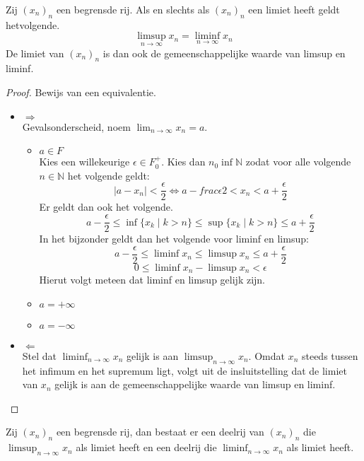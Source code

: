 \documentclass[main.tex]{subfiles}
\begin{document}
\begin{pr}
  Zij $(x_{n})_{n}$ een begrensde rij.
  Als en slechts als $(x_{n})_{n}$ een limiet heeft geldt hetvolgende.
  \[ \limsup_{n\rightarrow \infty} x_{n} = \liminf_{n\rightarrow \infty} x_{n} \]
  De limiet van $(x_{n})_{n}$ is dan ook de gemeenschappelijke waarde van limsup en liminf.

  \begin{proof}
    Bewijs van een equivalentie.
    \begin{itemize}
    \item $\Rightarrow$\\
      Gevalsonderscheid, noem $\lim_{n\rightarrow \infty}x_{n} = a$.
      \begin{itemize}
      \item $a\in F$\\
        Kies een willekeurige $\epsilon \in F_{0}^{+}$.
        Kies dan $n_{0}\inf \mathbb{N}$ zodat voor alle volgende $n\in \mathbb{N}$ het volgende geldt:
        \[ |a - x_{n}| < \frac{\epsilon}{2} \Leftrightarrow a-frac{\epsilon}{2} < x_{n} < a + \frac{\epsilon}{2} \]
        Er geldt dan ook het volgende.
        \[ a-\frac{\epsilon}{2} \le \inf\{x_{k}\mid k>n\}\le \sup\{x_{k}\mid k>n\} \le a + \frac{\epsilon}{2} \]
        In het bijzonder geldt dan het volgende voor liminf en limsup:
        \[ a-\frac{\epsilon}{2} \le \liminf x_{n}\le \limsup x_{n} \le a + \frac{\epsilon}{2} \]
        \[ 0  \le \liminf x_{n} - \limsup x_{n} < \epsilon \]
        Hierut volgt meteen dat liminf en limsup gelijk zijn.
      \item $a=+\infty$
      \item $a=-\infty$
      \end{itemize}
    \item $\Leftarrow$\\
      Stel dat $\liminf_{n\rightarrow \infty} x_{n}$ gelijk is aan $\limsup_{n\rightarrow \infty} x_{n}$.
      Omdat $x_{n}$ steeds tussen het infimum en het supremum ligt, volgt uit de insluitstelling dat de limiet van $x_{n}$ gelijk is aan de gemeenschappelijke waarde van limsup en liminf.
    \end{itemize}
  \end{proof}
\end{pr}

\begin{pr}
  Zij $(x_{n})_{n}$ een begrensde rij, dan bestaat er een deelrij van $(x_{n})_{n}$ die $\limsup_{n\rightarrow \infty} x_{n}$ als limiet heeft en een deelrij die $\liminf_{n\rightarrow \infty} x_{n}$ als limiet heeft.
\end{pr}
\end{document}
